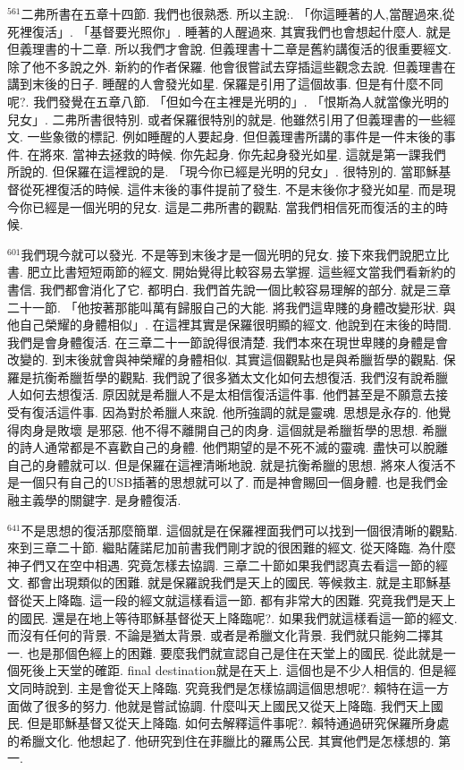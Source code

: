 \documentclass{book}
\begin{document}
$^{561}$二弗所書在五章十四節.
我們也很熟悉.
所以主說:.
「你這睡著的人,當醒過來,從死裡復活」.
「基督要光照你」.
睡著的人醒過來.
其實我們也會想起什麼人.
就是但義理書的十二章.
所以我們才會說.
但義理書十二章是舊約講復活的很重要經文.
除了他不多說之外.
新約的作者保羅.
他會很嘗試去穿插這些觀念去說.
但義理書在講到末後的日子.
睡醒的人會發光如星.
保羅是引用了這個故事.
但是有什麼不同呢?.
我們發覺在五章八節.
「但如今在主裡是光明的」.
「恨斯為人就當像光明的兒女」.
二弗所書很特別.
或者保羅很特別的就是.
他雖然引用了但義理書的一些經文.
一些象徵的標記.
例如睡醒的人要起身.
但但義理書所講的事件是一件末後的事件.
在將來.
當神去拯救的時候.
你先起身.
你先起身發光如星.
這就是第一課我們所說的.
但保羅在這裡說的是.
「現今你已經是光明的兒女」.
很特別的.
當耶穌基督從死裡復活的時候.
這件末後的事件提前了發生.
不是末後你才發光如星.
而是現今你已經是一個光明的兒女.
這是二弗所書的觀點.
當我們相信死而復活的主的時候.

$^{601}$我們現今就可以發光.
不是等到末後才是一個光明的兒女.
接下來我們說肥立比書.
肥立比書短短兩節的經文.
開始覺得比較容易去掌握.
這些經文當我們看新約的書信.
我們都會消化了它.
都明白.
我們首先說一個比較容易理解的部分.
就是三章二十一節.
「他按著那能叫萬有歸服自己的大能.
將我們這卑賤的身體改變形狀.
與他自己榮耀的身體相似」.
在這裡其實是保羅很明顯的經文.
他說到在末後的時間.
我們是會身體復活.
在三章二十一節說得很清楚.
我們本來在現世卑賤的身體是會改變的.
到末後就會與神榮耀的身體相似.
其實這個觀點也是與希臘哲學的觀點.
保羅是抗衡希臘哲學的觀點.
我們說了很多猶太文化如何去想復活.
我們沒有說希臘人如何去想復活.
原因就是希臘人不是太相信復活這件事.
他們甚至是不願意去接受有復活這件事.
因為對於希臘人來說.
他所強調的就是靈魂.
思想是永存的.
他覺得肉身是敗壞 是邪惡.
他不得不離開自己的肉身.
這個就是希臘哲學的思想.
希臘的詩人通常都是不喜歡自己的身體.
他們期望的是不死不滅的靈魂.
盡快可以脫離自己的身體就可以.
但是保羅在這裡清晰地說.
就是抗衡希臘的思想.
將來人復活不是一個只有自己的USB插著的思想就可以了.
而是神會賜回一個身體.
也是我們金融主義學的關鍵字.
是身體復活.

$^{641}$不是思想的復活那麼簡單.
這個就是在保羅裡面我們可以找到一個很清晰的觀點.
來到三章二十節.
繼貼薩諾尼加前書我們剛才說的很困難的經文.
從天降臨.
為什麼神子們又在空中相遇.
究竟怎樣去協調.
三章二十節如果我們認真去看這一節的經文.
都會出現類似的困難.
就是保羅說我們是天上的國民.
等候救主.
就是主耶穌基督從天上降臨.
這一段的經文就這樣看這一節.
都有非常大的困難.
究竟我們是天上的國民.
還是在地上等待耶穌基督從天上降臨呢?.
如果我們就這樣看這一節的經文.
而沒有任何的背景.
不論是猶太背景.
或者是希臘文化背景.
我們就只能夠二擇其一.
也是那個色經上的困難.
要麼我們就宣認自己是住在天堂上的國民.
從此就是一個死後上天堂的確距.
final destination就是在天上.
這個也是不少人相信的.
但是經文同時說到.
主是會從天上降臨.
究竟我們是怎樣協調這個思想呢?.
賴特在這一方面做了很多的努力.
他就是嘗試協調.
什麼叫天上國民又從天上降臨.
我們天上國民.
但是耶穌基督又從天上降臨.
如何去解釋這件事呢?.
賴特通過研究保羅所身處的希臘文化.
他想起了.
他研究到住在菲臘比的羅馬公民.
其實他們是怎樣想的.
第一.
\end{document}

